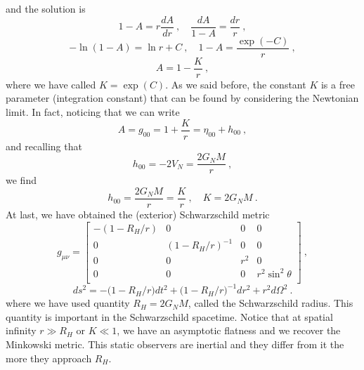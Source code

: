     and the solution is
    \begin{equation*}
        1 - A = r \frac{dA}{dr} ~, \quad \frac{dA}{1 - A} = \frac{dr}{r} ~,
    \end{equation*}
    \begin{equation*}
        - \ln (1-A) = \ln r + C ~, \quad 1 - A = \frac{\exp(- C)}{r} ~, 
    \end{equation*}
    \begin{equation*}
        A = 1 - \frac{K}{r} ~, 
    \end{equation*}
    where we have called $K = \exp(C)$. As we said before, the constant $K$ is a free parameter (integration constant) that can be found by considering the Newtonian limit. In fact, noticing that we can write  
    \begin{equation*}
        A = g_{00} = 1 + \frac{K}{r} = \eta_{00} + h_{00} ~,
    \end{equation*}
    and recalling that
    \begin{equation*}
        h_{00} = - 2 V_N = \frac{2 G_N M}{r} ~,
    \end{equation*}
    we find
    \begin{equation*}
        h_{00} = \frac{2 G_N M}{r} = \frac{K}{r} ~, \quad K = 2 G_N M ~.
    \end{equation*}
    At last, we have obtained the (exterior) Schwarzschild metric 
    \begin{equation*}
        g_{\mu\nu} = \begin{bmatrix}
            - (1 - R_H / r) & 0 & 0 & 0 \\
            0 & (1 - R_H / r)^{-1} & 0 & 0 \\
            0 & 0 & r^2 & 0 \\
            0 & 0 & 0 & r^2 \sin^2 \theta \\
        \end{bmatrix} ~, 
    \end{equation*}
    \begin{equation*}
        ds^2 = - \Big (1 - R_H / r \Big ) dt^2 + \Big (1 - R_H / r \Big )^{-1} dr^2 + r^2 d\Omega^2 ~.
    \end{equation*}
    where we have used quantity $R_H = 2 G_N M$, called the Schwarzschild radius. This quantity is important in the Schwarzschild spacetime. Notice that at spatial infinity $r \gg R_H$ or $K \ll 1$, we have an asymptotic flatness and we recover the Minkowski metric. This static observers are inertial and they differ from it the more they approach $R_H$. 

